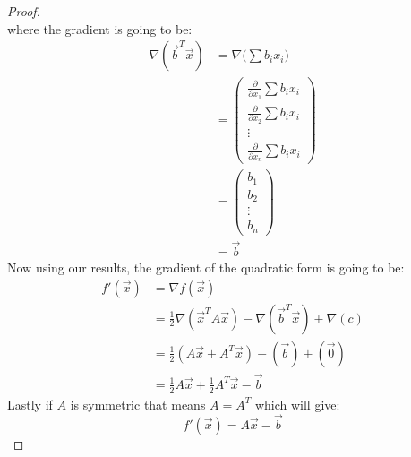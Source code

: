\documentclass[12pt, letterpaper, onecolumn, conference, final]{IEEEtran}
\theoremstyle{definition}
\theoremstyle{plain}
\begin{document}
\begin{proof}
\begin{equation*}
\end{equation*}
where the gradient is going to be:
\begin{equation*}
\begin{split}
\nabla (\overrightarrow{b}^T \overrightarrow{x}) &= \nabla \Big( \sum b_ix_i \Big) \\
&= \begin{pmatrix}
\frac{\partial}{\partial x_1} \sum b_ix_i \\
\frac{\partial}{\partial x_2} \sum b_ix_i \\
\vdots \\
\frac{\partial}{\partial x_n} \sum b_ix_i
\end{pmatrix} \\
&= \begin{pmatrix}
b_1 \\
b_2 \\
\vdots \\
b_n
\end{pmatrix} \\
&= \overrightarrow{b}
\end{split}
\end{equation*}
Now using our results, the gradient of the quadratic form is going to be:
\begin{equation*}
\begin{split}
f'(\overrightarrow{x}) &= \nabla f(\overrightarrow{x}) \\
&= \frac{1}{2}\nabla(\overrightarrow{x}^TA\overrightarrow{x}) - \nabla (\overrightarrow{b}^T \overrightarrow{x}) + \nabla (c) \\
&= \frac{1}{2}(A\overrightarrow{x} + A^T\overrightarrow{x}) - (\overrightarrow{b}) + (\overrightarrow{0}) \\
&= \frac{1}{2}A\overrightarrow{x} + \frac{1}{2}A^T\overrightarrow{x} - \overrightarrow{b}
\end{split}
\end{equation*}
Lastly if $A$ is symmetric that means $A = A^T$ which will give:
\begin{equation*}
f'(\overrightarrow{x}) = A\overrightarrow{x} - \overrightarrow{b}
\end{equation*}
\end{proof}
\end{document}
